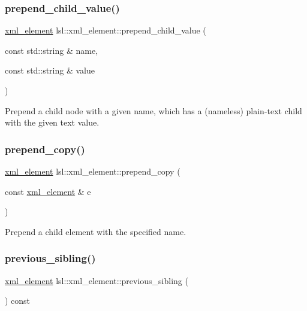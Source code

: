 \subsubsection{\texorpdfstring{prepend\+\_\+child\+\_\+value()}{prepend\_child\_value()}}
{\footnotesize\ttfamily \hyperlink{classlsl_1_1xml__element}{xml\+\_\+element} lsl\+::xml\+\_\+element\+::prepend\+\_\+child\+\_\+value (\begin{DoxyParamCaption}\item[{const std\+::string \&}]{name,  }\item[{const std\+::string \&}]{value }\end{DoxyParamCaption})\hspace{0.3cm}{\ttfamily [inline]}}

Prepend a child node with a given name, which has a (nameless) plain-\/text child with the given text value. \mbox{\label{classlsl_1_1xml__element_a1bea6df95134f909611b1c40218828d7}} 
\subsubsection{\texorpdfstring{prepend\+\_\+copy()}{prepend\_copy()}}
{\footnotesize\ttfamily \hyperlink{classlsl_1_1xml__element}{xml\+\_\+element} lsl\+::xml\+\_\+element\+::prepend\+\_\+copy (\begin{DoxyParamCaption}\item[{const \hyperlink{classlsl_1_1xml__element}{xml\+\_\+element} \&}]{e }\end{DoxyParamCaption})\hspace{0.3cm}{\ttfamily [inline]}}



Prepend a child element with the specified name. 

\mbox{\label{classlsl_1_1xml__element_a78c2e0b3d7bda2b5a2d478e3c0cdc87a}} 
\subsubsection{\texorpdfstring{previous\+\_\+sibling()}{previous\_sibling()}\hspace{0.1cm}{\footnotesize\ttfamily [1/2]}}
{\footnotesize\ttfamily \hyperlink{classlsl_1_1xml__element}{xml\+\_\+element} lsl\+::xml\+\_\+element\+::previous\+\_\+sibling (\begin{DoxyParamCaption}{ }\end{DoxyParamCaption}) const\hspace{0.3cm}{\ttfamily [inline]}}



